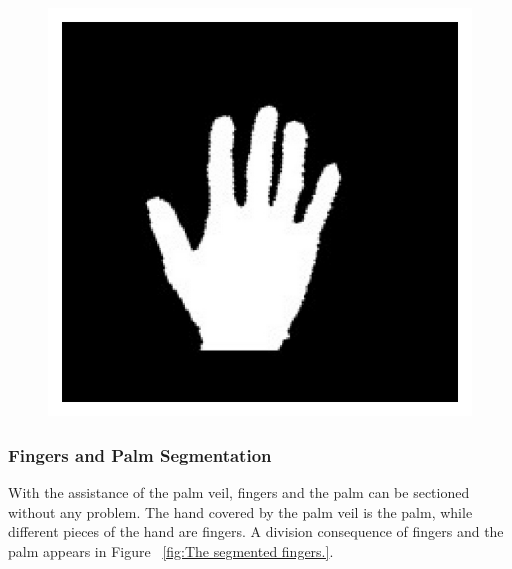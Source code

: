 \documentclass[a4paper]{article}
\begin{document}
\begin{figure}[h!]
\begin{center}
\includegraphics[scale=1.5]{Fig7}
 \label{fig:The rotated and cut hand image.}
\end{center}
\end{figure}

\subsubsection{Fingers and Palm Segmentation}
With the assistance of the palm veil, fingers and the palm can be sectioned without any problem. The hand covered by the palm veil is the palm, while different pieces of the hand are fingers. A division consequence of fingers and the palm appears in Figure ~\ref{fig:The segmented fingers.}.
\end{document}
